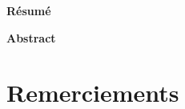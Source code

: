 \documentclass[a4paper,10pt]{report}    %
\begin{document}
\begin{titlepage}
\begin{center}
    \end{center}
\end{titlepage}




\thispagestyle{empty}
\begin{center}
    \Large
    \vspace{0.9cm}
    \textbf{Résumé}
\end{center}

\vspace{7cm}

\begin{center}
	\Large
	\vspace{0.9cm}
	\textbf{Abstract}
\end{center}





\newpage
\tableofcontents


\newpage




\newpage
%
\section*{Remerciements}
\setcounter{page}{1}


%




\newpage
\printbibliography
\appendix
%
%
%
%
%
\end{document}
